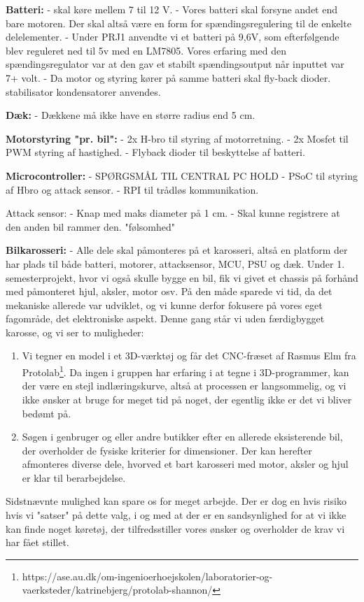 \textbf{Batteri:}
- skal køre mellem 7 til 12 V.
- Vores batteri skal forsyne andet end bare motoren. Der skal altså være en form for spændingsregulering til de enkelte delelementer.
- Under PRJ1 anvendte vi et batteri på 9,6V, som efterfølgende blev reguleret ned til 5v med en LM7805\cite{LM78xxData}. Vores erfaring med den spændingsregulator var at den gav et stabilt spændingsoutput når inputtet var 7+ volt.
- Da motor og styring kører på samme batteri skal fly-back dioder. stabilisator kondensatorer anvendes. 

\textbf{Dæk:}
- Dækkene må ikke have en større radius end 5 cm.

\textbf{Motorstyring "pr. bil":}
- 2x H-bro til styring af motorretning.
- 2x Mosfet til PWM styring af hastighed.
- Flyback dioder til beskyttelse af batteri.


\textbf{Microcontroller:} - SPØRGSMÅL TIL CENTRAL PC HOLD
- PSoC til styring af Hbro og attack sensor.
- RPI til trådløs kommunikation.

Attack sensor:
- Knap med maks diameter på 1 cm.
- Skal kunne registrere at den anden bil rammer den. "følsomhed"

\textbf{Bilkarosseri:}
- Alle dele skal påmonteres på et karosseri, altså en platform der har plads til både batteri, motorer, attacksensor, MCU, PSU og dæk.
Under 1. semesterprojekt, hvor vi også skulle bygge en bil, fik vi givet et chassis på forhånd med påmonteret hjul, aksler, motor osv. På den måde sparede vi tid, da det mekaniske allerede var udviklet, og vi kunne derfor fokusere på vores eget fagområde, det elektroniske aspekt.
Denne gang står vi uden færdigbygget karosse, og vi ser to muligheder:
\begin{enumerate}
    \item Vi tegner en model i et 3D-værktøj og får det CNC-fræset af Rasmus Elm fra Protolab\footnote{https://ase.au.dk/om-ingenioerhoejskolen/laboratorier-og-vaerksteder/katrinebjerg/protolab-shannon/}. Da ingen i gruppen har erfaring i at tegne i 3D-programmer, kan der være en stejl indlæringskurve, altså at processen er langsommelig, og vi ikke ønsker at bruge for meget tid på noget, der egentlig ikke er det vi bliver bedømt på. %
\item Søgen i genbruger og eller andre butikker efter en allerede eksisterende bil, der overholder de fysiske kriterier for dimensioner. Der kan herefter afmonteres diverse dele, hvorved et bart karosseri med motor, aksler og hjul er klar til berarbejdelse.
\end{enumerate}
Sidstnævnte mulighed kan spare os for meget arbejde. Der er dog en hvis risiko hvis vi "satser" på dette valg, i og med at der er en sandsynlighed for at vi ikke kan finde noget køretøj, der tilfredsstiller vores ønsker og overholder de krav vi har fået stillet.
